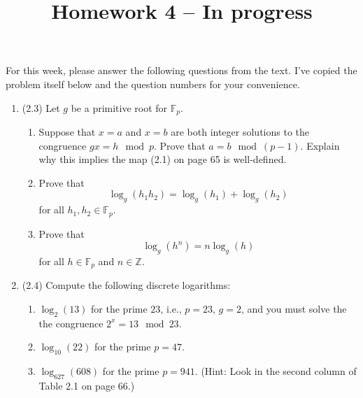 \documentclass[12pt]{amsart}
\theoremstyle{definition}
\begin{document}
\title{Homework 4 -- In progress }

\maketitle

For this week, please answer the following questions from the text. 
I've copied the problem itself below and the question numbers for 
your convenience. 

\begin{enumerate}
	\item (2.3) Let $g$ be a primitive root for $\mathbb{F}_p$.
	\begin{enumerate}
		\item Suppose that $x=a$ and $x=b$ are both integer solutions to the congruence 
			$gx = h \mod p$. Prove that $a = b \mod (p-1)$. Explain why this implies 
			the map (2.1) on page 65 is well-defined. 
		\item Prove that 
		\begin{displaymath}
			\log_g(h_1 h_2) = \log_g(h_1) + \log_g(h_2) 
		\end{displaymath}
		for all $h_1,h_2 \in \mathbb{F}_p$.
		\item Prove that 
		\begin{displaymath}
			\log_g(h^n) = n\log_g(h) 
		\end{displaymath}
		for all $h \in \mathbb{F}_p$ and $n \in \mathbb{Z}$.
	\end{enumerate}
\item (2.4) Compute the following discrete logarithms:
\begin{enumerate}
\item $\log_2(13)$ for the prime $23$, i.e., $p=23$, $g=2$, and you must solve the the 
	congruence $2^x = 13 \mod 23$. 
\item $\log_{10}(22)$ for the prime $p=47$. 
\item $\log_627(608)$ for the prime $p=941$. (Hint: Look in the second column of Table 2.1 on page 66.) 
\end{enumerate}
% 		
\end{enumerate}
\end{document}
